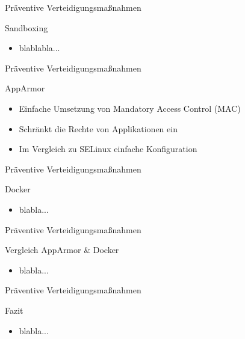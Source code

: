 \begin{frame}{Präventive Verteidigungsmaßnahmen}
        \begin{exampleblock}{Sandboxing}
                \begin{itemize}
                        \item blablabla... 
                \end{itemize}
        \end{exampleblock}
\end{frame}

\begin{frame}{Präventive Verteidigungsmaßnahmen}
        \begin{exampleblock}{AppArmor}
                \begin{itemize}
                        \item Einfache Umsetzung von Mandatory Access Control (MAC)
                        \pause
                        \item Schränkt die Rechte von Applikationen ein
                        \pause
                        \item Im Vergleich zu SELinux einfache Konfiguration
                \end{itemize}
        \end{exampleblock}
\end{frame}

\begin{frame}{Präventive Verteidigungsmaßnahmen}
        \begin{exampleblock}{Docker}
                \begin{itemize}
                        \item blabla...
                \end{itemize}
        \end{exampleblock}
\end{frame}

\begin{frame}{Präventive Verteidigungsmaßnahmen}
        \begin{exampleblock}{Vergleich AppArmor \& Docker}
        \begin{itemize}
                \item blabla... 
        \end{itemize}
\end{exampleblock}
\end{frame}

\begin{frame}{Präventive Verteidigungsmaßnahmen}
        \begin{exampleblock}{Fazit}
                \begin{itemize}
                        \item blabla... 
                \end{itemize}
        \end{exampleblock}
\end{frame}

